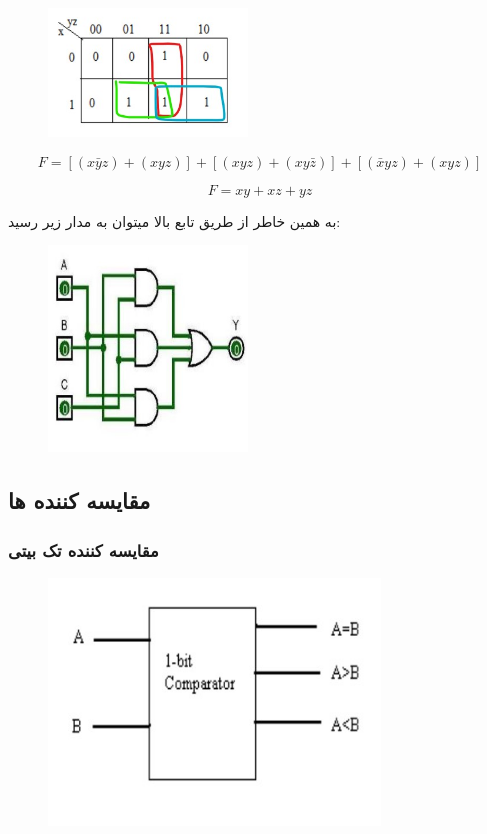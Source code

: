 \documentclass[20pt, a4paper]{article}
\begin{document}
\begin{figure}[htbp]\centering
	\centerline{\includegraphics[width=150pt]{img/lastest/mS.jpg}}
\end{figure}

\begin{equation}
	F= [(x\bar{y}z)+(xyz)] + [(xyz)+(xy\bar{z})]+ [(\bar{x}yz)+(xyz)]
\end{equation}

\begin{equation}
	F = xy+xz+yz
\end{equation}

به همین خاطر از طریق تابع بالا میتوان به مدار زیر رسید:
\begin{figure}[htbp]\centering
	\centerline{\includegraphics[width=150pt]{img/lastest/majorityCircuit.jpg}}
\end{figure}
\newpage


\subsection{مقایسه کننده ها }
\subsubsection{مقایسه کننده تک بیتی}
\begin{figure}[htbp]\centering
	\centerline{\includegraphics[width=250pt]{img/lastest/singleBitBDiagram.jpg}}
\end{figure}
\end{document}
